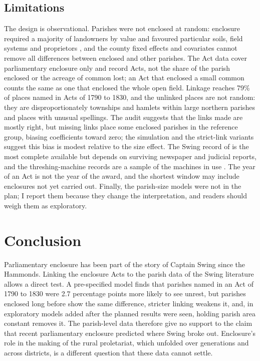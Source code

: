 \documentclass[11pt,a4paper]{article}
\begin{document}
\subsection{Limitations}
The design is observational. Parishes were not enclosed at random: enclosure required a majority of landowners by value and favoured particular soils, field systems and proprietors \citep{turner1980,allen1992}, and the county fixed effects and covariates cannot remove all differences between enclosed and other parishes. The Act data cover parliamentary enclosure only and record Acts, not the share of the parish enclosed or the acreage of common lost; an Act that enclosed a small common counts the same as one that enclosed the whole open field. Linkage reaches 79\% of places named in Acts of 1790 to 1830, and the unlinked places are not random: they are disproportionately townships and hamlets within large northern parishes and places with unusual spellings. The audit suggests that the links made are mostly right, but missing links place some enclosed parishes in the reference group, biasing coefficients toward zero; the simulation and the strict-link variants suggest this bias is modest relative to the size effect. The Swing record of \citet{holland2005} is the most complete available but depends on surviving newspaper and judicial reports, and the threshing-machine records are a sample of the machines in use \citep{caprettinivoth2020}. The year of an Act is not the year of the award, and the shortest window may include enclosures not yet carried out. Finally, the parish-size models were not in the plan; I report them because they change the interpretation, and readers should weigh them as exploratory.

\section{Conclusion}
Parliamentary enclosure has been part of the story of Captain Swing since the Hammonds. Linking the enclosure Acts to the parish data of the Swing literature allows a direct test. A pre-specified model finds that parishes named in an Act of 1790 to 1830 were 2.7 percentage points more likely to see unrest, but parishes enclosed long before show the same difference, stricter linking weakens it, and, in exploratory models added after the planned results were seen, holding parish area constant removes it. The parish-level data therefore give no support to the claim that recent parliamentary enclosure predicted where Swing broke out. Enclosure's role in the making of the rural proletariat, which unfolded over generations and across districts, is a different question that these data cannot settle.
\end{document}
